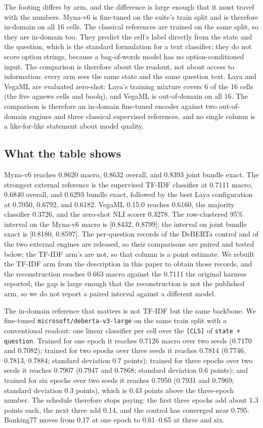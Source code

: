 \documentclass[11pt]{article}
\begin{document}
The footing differs by arm, and the difference is large enough that it must travel with the
numbers. Myna-v6{} is fine-tuned on the suite's train split and is therefore in-domain on all 16
cells. The classical references are trained on the same split, so they are in-domain too. They predict
the cell's label directly from the state and the question, which is the standard formulation for a
text classifier; they do not score option strings, because a bag-of-words model has no
option-conditioned input. The comparison is therefore about the readout, not about access to
information: every arm sees the same state and the same question text.
Laya and VegaML are evaluated zero-shot: Laya's training mixture covers 6 of the 16 cells (the
five agnews cells and boolq), and VegaML is out-of-domain on all 16. The comparison is therefore
an in-domain fine-tuned encoder against two out-of-domain engines and three classical supervised
references, and no single column is a like-for-like statement about model quality.

\subsection{What the table shows}
Myna-v6{} reaches 0.8620 macro, 0.8632 overall, and 0.8393 joint bundle exact. The strongest
external reference is the supervised TF-IDF classifier at 0.7111 macro, 0.6840 overall, and
0.6293 bundle exact, followed by the best Laya configuration at 0.7050, 0.6792, and 0.6182.
VegaML 0.15.0 reaches 0.6160, the majority classifier 0.3726, and the zero-shot NLI scorer 0.3278.
The row-clustered 95\% interval on the Myna-v6{} macro is [0.8432, 0.8799]; the interval on joint
bundle exact is [0.8180, 0.8597]. The per-question records of the DeBERTa control and of the two
external engines are released, so their comparisons are paired and tested below; the TF-IDF arm's
are not, so that column is a point estimate. We rebuilt the TF-IDF arm from the description in this
paper to obtain those records, and the reconstruction reaches 0.663 macro against the 0.7111 the
original harness reported; the gap is large enough that the reconstruction is not the published arm,
so we do not report a paired interval against a different model.

The in-domain reference that matters is not TF-IDF but the same backbone. We fine-tuned
\texttt{microsoft/deberta-v3-large} on the same train split with a conventional readout: one linear
classifier per cell over the \texttt{[CLS]} of \texttt{state + question}. Trained for one epoch it reaches 0.7126 macro over two seeds (0.7170 and 0.7082); trained for two
epochs over three seeds it reaches 0.7814 (0.7746, 0.7813, 0.7884; standard deviation 0.7 points);
trained for three epochs over two seeds it reaches 0.7907 (0.7947 and 0.7868; standard deviation 0.6
points); and trained for six epochs over two seeds it reaches 0.7950 (0.7931 and 0.7969; standard
deviation 0.3 points), which is 0.43 points above the three-epoch number. The schedule therefore
stops paying: the first three epochs add about 1.3 points each, the next three add 0.14, and the
control has converged near 0.795. Banking77 moves from 0.17 at one epoch to 0.61--0.65 at three and
six.
\end{document}
